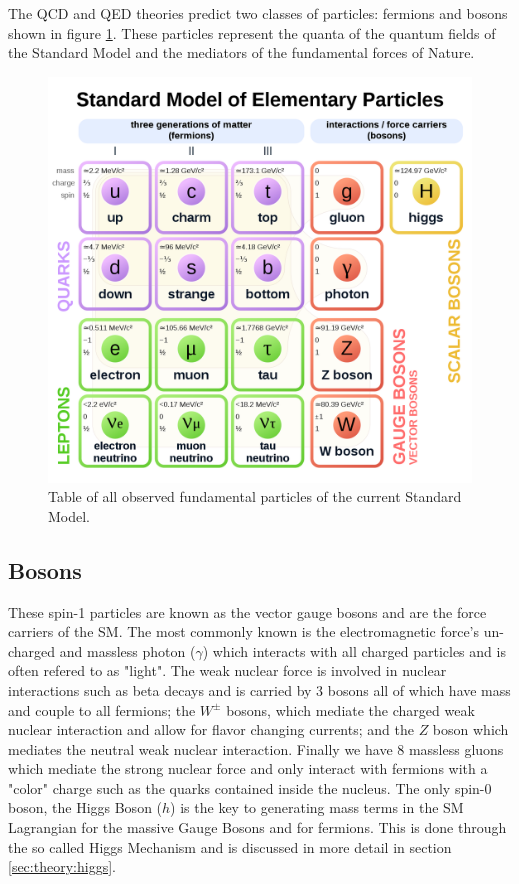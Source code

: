 The QCD and QED theories predict two classes of particles: fermions and bosons
shown in figure \ref{fig:standard_model}. These particles represent the quanta
of the quantum fields of the Standard Model and the mediators of the fundamental
forces of Nature.

\begin{figure}[!htbp]
  \begin{center}
    \includegraphics[width=0.8\linewidth]{figures/theory/standard_model.png}
    \caption{ Table of all observed fundamental particles of the current
Standard Model.}
    \label{fig:standard_model}
  \end{center}
\end{figure}

\subsection{Bosons} \label{sec:theory:bosons}

These spin-1 particles are known as the vector gauge bosons and are the
force carriers of the SM.  The most commonly known is the electromagnetic
force's un-charged and massless photon ($\gamma$) which interacts with all
charged particles and is often refered to as "light".  The weak nuclear force is
involved in nuclear interactions such as beta decays and is carried by 3 bosons
all of which have mass and couple to all fermions; the $W^{\pm}$ bosons, which
mediate the charged weak nuclear interaction and allow for flavor changing
currents; and the $Z$ boson which mediates the neutral weak nuclear interaction.
Finally we have 8 massless gluons which mediate the strong nuclear force and
only interact with fermions with a "color" charge such as the quarks contained
inside the nucleus. The only spin-0 boson, the Higgs Boson ($h$) is the key to
generating mass terms in the SM Lagrangian for the massive Gauge Bosons and for
fermions.  This is done through the so called Higgs Mechanism and is discussed
in more detail in section \ref{sec:theory:higgs}.

